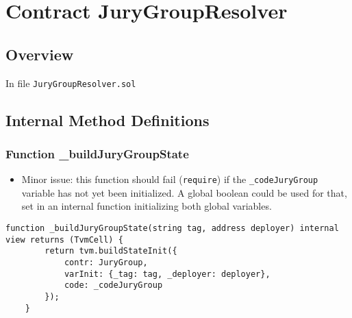 
\chapter{Contract JuryGroupResolver}

\minitoc

\section{Overview}


In file {\tt JuryGroupResolver.sol}

\section{Internal Method Definitions}


\subsection{Function \_{}buildJuryGroupState}

\begin{itemize}
\item Minor issue: this function should fail ({\tt require}) if the
  {\tt \_codeJuryGroup} variable has not yet been initialized. A global
  boolean could be used for that, set in an internal function
  initializing both global variables.
\end{itemize}

\begin{lstlisting}[firstnumber=14]
    function _buildJuryGroupState(string tag, address deployer) internal view returns (TvmCell) {
        return tvm.buildStateInit({
            contr: JuryGroup,
            varInit: {_tag: tag, _deployer: deployer},
            code: _codeJuryGroup
        });
    }
\end{lstlisting}
